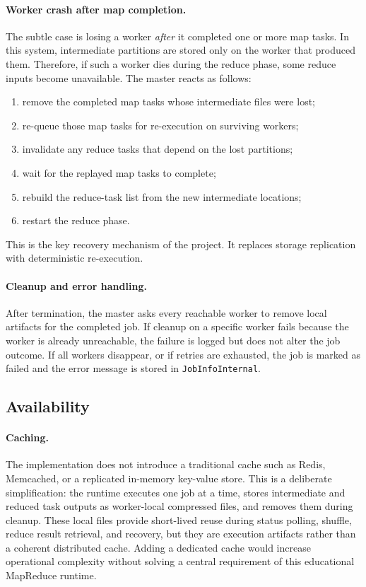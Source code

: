 \documentclass{scrartcl}
\begin{document}
\paragraph{Worker crash after map completion.}
The subtle case is losing a worker \emph{after} it completed one or more map tasks. In this system, intermediate partitions are stored only on the worker that produced them. Therefore, if such a worker dies during the reduce phase, some reduce inputs become unavailable. The master reacts as follows:
%
\begin{enumerate}
    \item remove the completed map tasks whose intermediate files were lost;
    \item re-queue those map tasks for re-execution on surviving workers;
    \item invalidate any reduce tasks that depend on the lost partitions;
    \item wait for the replayed map tasks to complete;
    \item rebuild the reduce-task list from the new intermediate locations;
    \item restart the reduce phase.
\end{enumerate}

This is the key recovery mechanism of the project. It replaces storage replication with deterministic re-execution.

\paragraph{Cleanup and error handling.}
After termination, the master asks every reachable worker to remove local artifacts for the completed job. If cleanup on a specific worker fails because the worker is already unreachable, the failure is logged but does not alter the job outcome. If all workers disappear, or if retries are exhausted, the job is marked as failed and the error message is stored in \texttt{JobInfoInternal}.

\subsection{Availability}\label{availability}

\paragraph{Caching.}
The implementation does not introduce a traditional cache such as Redis, Memcached, or a replicated in-memory key-value store. This is a deliberate simplification: the runtime executes one job at a time, stores intermediate and reduced task outputs as worker-local compressed files, and removes them during cleanup. These local files provide short-lived reuse during status polling, shuffle, reduce result retrieval, and recovery, but they are execution artifacts rather than a coherent distributed cache. Adding a dedicated cache would increase operational complexity without solving a central requirement of this educational MapReduce runtime.
\end{document}
